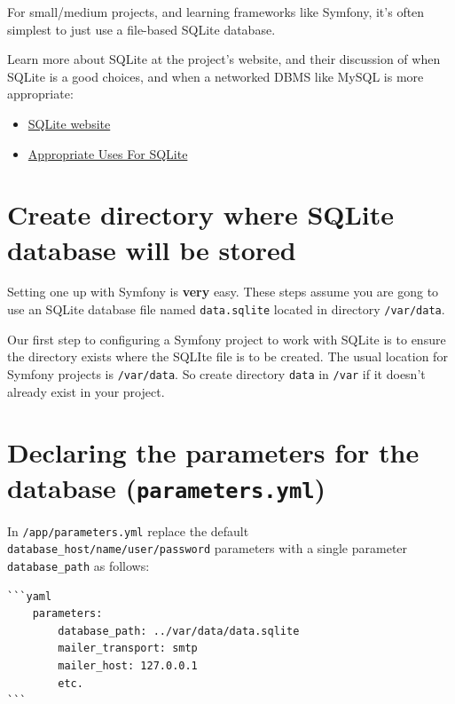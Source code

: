\documentclass[a4paperpaper,openright]{book}
\begin{document}
For small/medium projects, and learning frameworks like Symfony, it's
often simplest to just use a file-based SQLite database.

Learn more about SQLite at the project's website, and their discussion
of when SQLite is a good choices, and when a networked DBMS like MySQL
is more appropriate:

\begin{itemize}
\item
  \href{https://www.sqlite.org/}{SQLite website}
\item
  \href{http://www.sqlite.org/whentouse.html}{Appropriate Uses For
  SQLite}
\end{itemize}

\hypertarget{create-directory-where-sqlite-database-will-be-stored}{%
\section{Create directory where SQLite database will be
stored}\label{create-directory-where-sqlite-database-will-be-stored}}

Setting one up with Symfony is \textbf{very} easy. These steps assume
you are gong to use an SQLite database file named \texttt{data.sqlite}
located in directory \texttt{/var/data}.

Our first step to configuring a Symfony project to work with SQLite is
to ensure the directory exists where the SQLIte file is to be created.
The usual location for Symfony projects is \texttt{/var/data}. So create
directory \texttt{data} in \texttt{/var} if it doesn't already exist in
your project.

\hypertarget{declaring-the-parameters-for-the-database-parameters.yml-1}{%
\section{\texorpdfstring{Declaring the parameters for the database
(\texttt{parameters.yml})}{Declaring the parameters for the database (parameters.yml)}}\label{declaring-the-parameters-for-the-database-parameters.yml-1}}

In \texttt{/app/parameters.yml} replace the default
\texttt{database\_host/name/user/password} parameters with a single
parameter \texttt{database\_path} as follows:

\begin{verbatim}
```yaml
    parameters:
        database_path: ../var/data/data.sqlite
        mailer_transport: smtp
        mailer_host: 127.0.0.1
        etc.
```
\end{verbatim}
\end{document}
